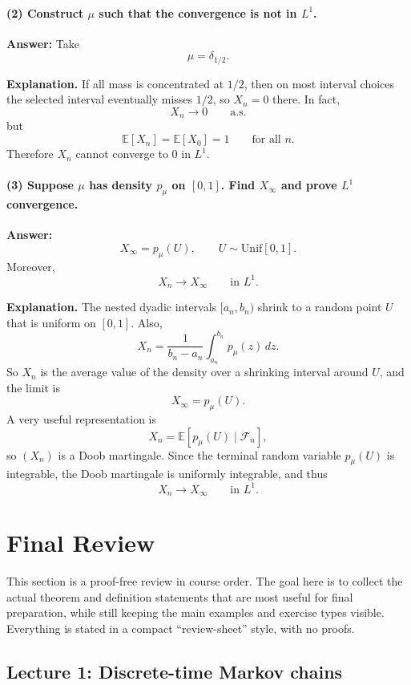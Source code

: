 \documentclass[11pt]{article}
\theoremstyle{definition}
\begin{document}
\paragraph{(2) Construct $\mu$ such that the convergence is not in $L^1$.}

\textbf{Answer:} Take
\[
\mu=\delta_{1/2}.
\]

\textbf{Explanation.} If all mass is concentrated at $1/2$, then on most interval choices the selected interval eventually misses $1/2$, so $X_n=0$ there. In fact,
\[
X_n\to 0 \qquad \text{a.s.}
\]
but
\[
\mathbb E[X_n]=\mathbb E[X_0]=1
\qquad \text{for all } n.
\]
Therefore $X_n$ cannot converge to $0$ in $L^1$.

\paragraph{(3) Suppose $\mu$ has density $p_\mu$ on $[0,1]$. Find $X_\infty$ and prove $L^1$ convergence.}

\textbf{Answer:}
\[
X_\infty = p_\mu(U),
\qquad
U\sim \mathrm{Unif}[0,1].
\]
Moreover,
\[
X_n\to X_\infty \qquad \text{in }L^1.
\]

\textbf{Explanation.} The nested dyadic intervals $[a_n,b_n)$ shrink to a random point $U$ that is uniform on $[0,1]$. Also,
\[
X_n = \frac{1}{b_n-a_n}\int_{a_n}^{b_n} p_\mu(z)\,dz.
\]
So $X_n$ is the average value of the density over a shrinking interval around $U$, and the limit is
\[
X_\infty=p_\mu(U).
\]
A very useful representation is
\[
X_n=\mathbb E[p_\mu(U)\mid \mathcal F_n],
\]
so $(X_n)$ is a Doob martingale. Since the terminal random variable $p_\mu(U)$ is integrable, the Doob martingale is uniformly integrable, and thus
\[
X_n\to X_\infty
\qquad \text{in }L^1.
\]

\clearpage
\section{Final Review}

\begin{summarybox}
This section is a proof-free review in course order. The goal here is to collect the actual theorem and definition statements that are most useful for final preparation, while still keeping the main examples and exercise types visible. Everything is stated in a compact ``review-sheet'' style, with no proofs.
\end{summarybox}

\subsection{Lecture 1: Discrete-time Markov chains}
\end{document}
